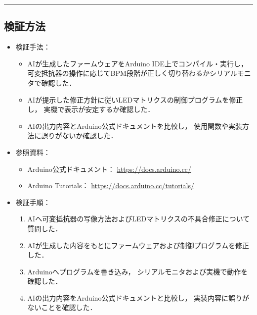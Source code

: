 \documentclass[uplatex,dvipdfmx,a4paper,11pt]{jsarticle}
\newcommand{\sectionrule}{\par\medskip\noindent\rule{\linewidth}{0.6pt}\par\medskip}
\begin{document}
\sectionrule

\subsection{検証方法}

\begin{itemize}

    \item 検証手法：
      \begin{itemize}
        \item AIが生成したファームウェアをArduino IDE上でコンパイル・実行し，
        可変抵抗器の操作に応じてBPM段階が正しく切り替わるかシリアルモニタで確認した．

        \item AIが提示した修正方針に従いLEDマトリクスの制御プログラムを修正し，
        実機で表示が安定するか確認した．

        \item AIの出力内容とArduino公式ドキュメントを比較し，
        使用関数や実装方法に誤りがないか確認した．
      \end{itemize}

      \item 参照資料：
      \begin{itemize}
        \item Arduino公式ドキュメント：
        \url{https://docs.arduino.cc/}

        \item Arduino Tutorials：
        \url{https://docs.arduino.cc/tutorials/}
      \end{itemize}

      \item 検証手順：
    \begin{enumerate}
      \item AIへ可変抵抗器の写像方法およびLEDマトリクスの不具合修正について質問した．

      \item AIが生成した内容をもとにファームウェアおよび制御プログラムを修正した．

      \item Arduinoへプログラムを書き込み，
      シリアルモニタおよび実機で動作を確認した．

      \item AIの出力内容をArduino公式ドキュメントと比較し，
      実装内容に誤りがないことを確認した．
    \end{enumerate}

\end{itemize}
\end{document}
